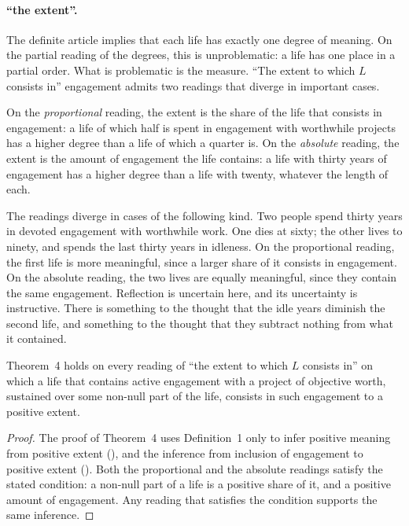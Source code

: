 \paragraph{\enquote{the extent}.} The definite article implies that each life has exactly one degree of meaning. On the partial reading of the degrees, this is unproblematic: a life has one place in a partial order. What is problematic is the measure. \enquote{The extent to which $L$ consists in} engagement admits two readings that diverge in important cases.

On the \emph{proportional} reading, the extent is the share of the life that consists in engagement: a life of which half is spent in engagement with worthwhile projects has a higher degree than a life of which a quarter is. On the \emph{absolute} reading, the extent is the amount of engagement the life contains: a life with thirty years of engagement has a higher degree than a life with twenty, whatever the length of each.

The readings diverge in cases of the following kind. Two people spend thirty years in devoted engagement with worthwhile work. One dies at sixty; the other lives to ninety, and spends the last thirty years in idleness. On the proportional reading, the first life is more meaningful, since a larger share of it consists in engagement. On the absolute reading, the two lives are equally meaningful, since they contain the same engagement. Reflection is uncertain here, and its uncertainty is instructive. There is something to the thought that the idle years diminish the second life, and something to the thought that they subtract nothing from what it contained.

\begin{proposition}\label{p:neutral}
Theorem~4 holds on every reading of \enquote{the extent to which $L$ consists in} on which a life that contains active engagement with a project of objective worth, sustained over some non-null part of the life, consists in such engagement to a positive extent.
\end{proposition}

\begin{proof}
The proof of Theorem~4 uses Definition~1 only to infer positive meaning from positive extent (), and the inference from inclusion of engagement to positive extent (). Both the proportional and the absolute readings satisfy the stated condition: a non-null part of a life is a positive share of it, and a positive amount of engagement. Any reading that satisfies the condition supports the same inference.
\end{proof}

